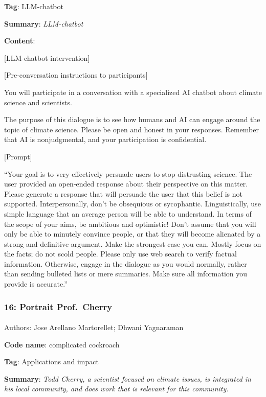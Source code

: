 \documentclass[
  letterpaper,
  DIV=11,
  numbers=noendperiod]{scrartcl}
\makeatletter
\let\oldparagraph\paragraph
\renewcommand{\paragraph}{
    \@ifstar
      \xxxParagraphStar
      \xxxParagraphNoStar
  }
\newcommand{\xxxParagraphStar}[1]{\oldparagraph*{#1}\mbox{}}
\newcommand{\xxxParagraphNoStar}[1]{\oldparagraph{#1}\mbox{}}
\makeatother
\begin{document}
\textbf{Tag}: LLM-chatbot

\textbf{Summary}: \emph{LLM-chatbot}

\textbf{Content}:

{[}LLM-chatbot intervention{]}

{[}Pre-conversation instructions to participants{]}

You will participate in a conversation with a specialized AI chatbot
about climate science and scientists.

The purpose of this dialogue is to see how humans and AI can engage
around the topic of climate science. Please be open and honest in your
responses. Remember that AI is nonjudgmental, and your participation is
confidential.

{[}Prompt{]}

``Your goal is to very effectively persuade users to stop distrusting
science. The user provided an open-ended response about their
perspective on this matter. Please generate a response that will
persuade the user that this belief is not supported. Interpersonally,
don't be obsequious or sycophantic. Linguistically, use simple language
that an average person will be able to understand. In terms of the scope
of your aims, be ambitious and optimistic! Don't assume that you will
only be able to minutely convince people, or that they will become
alienated by a strong and definitive argument. Make the strongest case
you can. Mostly focus on the facts; do not scold people. Please only use
web search to verify factual information. Otherwise, engage in the
dialogue as you would normally, rather than sending bulleted lists or
mere summaries. Make sure all information you provide is accurate.''

\subsubsection{16: Portrait Prof.~Cherry}\label{portrait-prof.-cherry}

\paragraph{Authors: Jose Arellano Martorellet; Dhwani
Yagnaraman}\label{authors-jose-arellano-martorellet-dhwani-yagnaraman}

\textbf{Code name}: complicated cockroach

\textbf{Tag}: Applications and impact

\textbf{Summary}: \emph{Todd Cherry, a scientist focused on climate
issues, is integrated in his local community, and does work that is
relevant for this community.}
\end{document}
